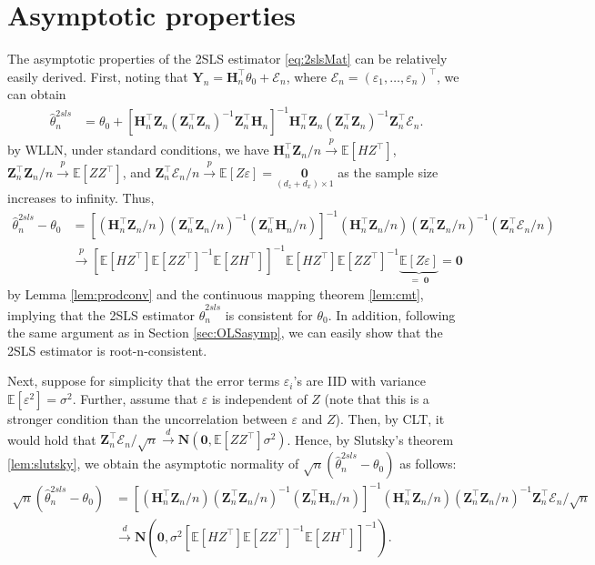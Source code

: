 \documentclass[10.5pt, A4paper, openany, uplatex]{book}
\newcommand{\mbf}{\mathbf}
\newcommand{\mcl}{\mathcal}
\newcommand{\eps}{\varepsilon}
\newcommand{\E}{\mathbb{E}}
\renewcommand{\hat}{\widehat}
\numberwithin{equation}{section}
\begin{document}
\section{Asymptotic properties}\label{sec:2slsAsymptotics}

The asymptotic properties of the 2SLS estimator \eqref{eq:2slsMat} can be relatively easily derived.
First, noting that $\mbf{Y}_n = \mbf{H}_n^\top\theta_0 + \mcl{E}_n$, where $\mcl{E}_n = (\eps_1, \ldots , \eps_n)^\top$, we can obtain
\begin{align*}
	\hat\theta_n^{2sls} 
	& = \theta_0 + \left[\mbf{H}_n^\top \mbf{Z}_n(\mbf{Z}_n^\top \mbf{Z}_n)^{-1}\mbf{Z}_n^\top \mbf{H}_n  \right]^{-1}\mbf{H}_n^\top \mbf{Z}_n(\mbf{Z}_n^\top \mbf{Z}_n)^{-1}\mbf{Z}_n^\top\mcl{E}_n.
\end{align*}
by WLLN, under standard conditions, we have $\mbf{H}_n^\top \mbf{Z}_n/n \overset{p}{\to} \E[H Z^\top]$,  $\mbf{Z}_n^\top \mbf{Z}_n/n \overset{p}{\to} \E[Z Z^\top]$, and  $\mbf{Z}_n^\top \mcl{E}_n/n \overset{p}{\to} \E[Z \eps] = \underset{(d_z + d_x)\times 1}{\mbf{0}}$ as the sample size increases to infinity.
Thus,
\begin{align*}	
	\hat\theta_n^{2sls} - \theta_0
	& = \left[(\mbf{H}_n^\top \mbf{Z}_n/n)(\mbf{Z}_n^\top \mbf{Z}_n/n)^{-1}(\mbf{Z}_n^\top \mbf{H}_n/n ) \right]^{-1}(\mbf{H}_n^\top \mbf{Z}_n/n)(\mbf{Z}_n^\top \mbf{Z}_n/n)^{-1}(\mbf{Z}_n^\top\mcl{E}_n/n) \\
	& \overset{p}{\to} \left[ \E[H Z^\top] \E[Z Z^\top]^{-1} \E[Z H^\top] \right]^{-1} \E[H Z^\top] \E[Z Z^\top]^{-1} \underbrace{\E[Z \eps]}_{= \; \mbf{0}} = \mbf{0}
\end{align*}
by Lemma \ref{lem:prodconv} and the continuous mapping theorem \ref{lem:cmt}, implying that the 2SLS estimator $\hat\theta_n^{2sls}$ is consistent for $\theta_0$.
In addition, following the same argument as in Section \ref{sec:OLSasymp}, we can easily show that the 2SLS estimator is root-n-consistent.

Next, suppose for simplicity that the error terms $\eps_i$'s are IID with variance $\E[\eps^2] = \sigma^2$.
Further, assume that $\eps$ is independent of $Z$ (note that this is a stronger condition than the uncorrelation between $\eps$ and $Z$).
Then, by CLT, it would hold that $\mbf{Z}_n^\top\mcl{E}_n/\sqrt{n} \overset{d}{\to} \mbf{N}(\mbf{0}, \E[Z Z^\top]\sigma^2)$.
Hence, by Slutsky's theorem \ref{lem:slutsky}, we obtain the asymptotic normality of $\sqrt{n}(\hat\theta_n^{2sls} - \theta_0)$ as follows:
\begin{align*}
	\sqrt{n}(\hat\theta_n^{2sls} - \theta_0) 
	& = \left[(\mbf{H}_n^\top \mbf{Z}_n/n)(\mbf{Z}_n^\top \mbf{Z}_n/n)^{-1}(\mbf{Z}_n^\top \mbf{H}_n/n ) \right]^{-1}(\mbf{H}_n^\top \mbf{Z}_n/n)(\mbf{Z}_n^\top \mbf{Z}_n/n)^{-1}\mbf{Z}_n^\top\mcl{E}_n/\sqrt{n} \\
	& \overset{d}{\to} \mbf{N}\left(\mbf{0}, \sigma^2  \left[ \E[H Z^\top] \E[Z Z^\top]^{-1} \E[Z H^\top] \right]^{-1}\right).
\end{align*}
\end{document}
